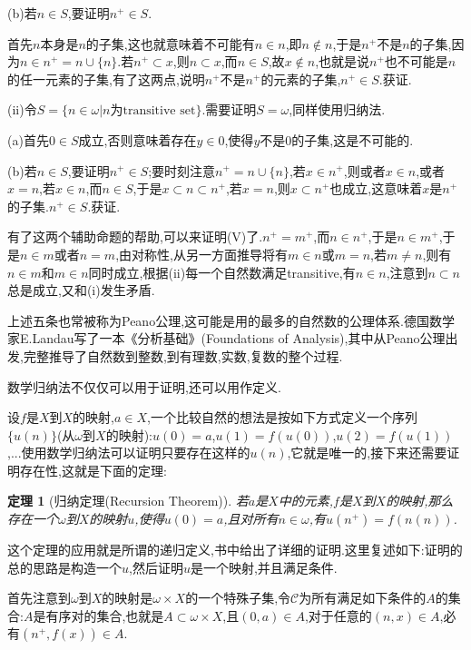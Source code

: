 \documentclass[12pt,a4paper,openany]{book}
\newtheorem{theorem}{定理}[section]
\begin{document}
(b)若$n \in S$,要证明$n^+ \in S$.

首先$n$本身是$n$的子集,这也就意味着不可能有$n \in n$,即$n \notin n$,于是$n^+$不是$n$的子集,因为$n \in n^+=n \cup \{n\}$.若$n^+ \subset x$,则$n \subset x$,而$n \in S$,故$x \notin n$,也就是说$n^+$也不可能是$n$的任一元素的子集,有了这两点,说明$n^+$不是$n^+$的元素的子集,$n^+ \in S$.获证.

(ii)令$S = \{n \in \omega| n\text{为transitive set}\}$.需要证明$S = \omega$,同样使用归纳法.

(a)首先$0 \in S$成立,否则意味着存在$y \in 0$,使得$y$不是$0$的子集,这是不可能的.

(b)若$n \in S$,要证明$n^+ \in S$;要时刻注意$n^+ = n \cup \{n\}$,若$x \in n^+$,则或者$x \in n$,或者$x = n$,若$x \in n$,而$n \in S$,于是$x \subset n \subset n^+$,若$x=n$,则$x \subset n^+$也成立,这意味着$x$是$n^+$的子集.$n^+ \in S$.获证.

有了这两个辅助命题的帮助,可以来证明(V)了.$n^+=m^+$,而$n \in n^+$,于是$n \in m^+$,于是$n \in m$或者$n=m$,由对称性,从另一方面推导将有$m \in n$或$m=n$,若$m \neq n$,则有$n \in m$和$m \in n$同时成立,根据(ii)每一个自然数满足transitive,有$n \in n$,注意到$n \subset n$总是成立,又和(i)发生矛盾.

上述五条也常被称为Peano公理,这可能是用的最多的自然数的公理体系.德国数学家E.Landau写了一本《分析基础》(Foundations of Analysis),其中从Peano公理出发,完整推导了自然数到整数,到有理数,实数,复数的整个过程.

数学归纳法不仅仅可以用于证明,还可以用作定义.

设$f$是$X$到$X$的映射,$a \in X$,一个比较自然的想法是按如下方式定义一个序列$\{u(n)\}$(从$\omega$到$X$的映射):$u(0)=a$,$u(1)=f(u(0))$,$u(2)=f(u(1))$,...使用数学归纳法可以证明只要存在这样的$u(n)$,它就是唯一的,接下来还需要证明存在性,这就是下面的定理:

\begin{theorem}[归纳定理(Recursion Theorem)]
若$a$是$X$中的元素,$f$是$X$到$X$的映射,那么存在一个$\omega$到$X$的映射$u$,使得$u(0)=a$,且对所有$n \in \omega$,有$u(n^+)=f(n(n))$.
\end{theorem}

这个定理的应用就是所谓的递归定义,书中给出了详细的证明.这里复述如下:证明的总的思路是构造一个$u$,然后证明$u$是一个映射,并且满足条件.

首先注意到$\omega$到$X$的映射是$\omega \times X$的一个特殊子集,令$\mathscr{C}$为所有满足如下条件的$A$的集合:$A$是有序对的集合,也就是$A \subset \omega \times X$,且$(0,a) \in A$,对于任意的$(n,x) \in A$,必有$(n^+,f(x)) \in A$.
\end{document}
